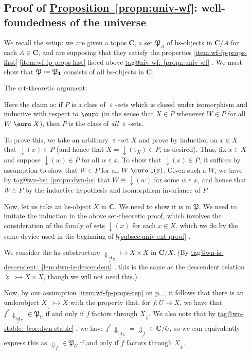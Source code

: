 \documentclass{amsart}
\makeatletter
\newcommand\alttext{\texorpdfstring}
\newcommand\bC{\mathbf{C}}
\newcommand\defeq{\mathrel{\vcenter{\baselineskip0.5ex \lineskiplimit0pt \hbox{.}\hbox{.}}} =}
\newcommand\dwnfn{{\downarrow}}
\newcommand\Dwn{{\Downarrow}}
\newcommand\Ein{\mathrel{\text{\textup{\euro}}}}
\newcommand\ein{\mathrel{\varepsilon}}
\newcommand\fP{\mathfrak{P}}
\newcommand\id{\mathrm{id}}
\newcommand\rt{\mathrm{t}}
\newcommand\tm{\mathbf{1}}
\newcommand\tto{\rightarrowtail}
\newcommand\und[1]{\underline{#1}}
\newcommand\unein{{\ein}}
\newcommand\unEin{{\Ein}}
\newcommand\tagword[1]{\csname tag@#1\endcsname}
\def\label@tag#1:#2\@nil{#1}
\newcommand\labeltag[1]{\label@tag#1:\@nil}
\newcommand\jref[1]{%
  \texorpdfstring%
    {\hyperref[#1]{\tagword{\labeltag{#1}}~\ref*{#1}}}%
    {\tagword{\labeltag{#1}}~\ref*{#1}}%
}
\newcommand\prerefpost[3]{%
  \texorpdfstring%
    {\hyperref[#2]{#1\ref*{#2}#3}}%
    {#1\ref*{#2}#3}%
}
\newcommand\sref[1]{\prerefpost{\S}{#1}{}}
\newcommand\pref[1]{\hyperref[#1]{p.~\pageref*{#1}}}
\theoremstyle{definition}
\theoremstyle{remark}
\theoremstyle{plainwithref}
\newenvironment{settybox}{\begin{tcolorbox}[colback=blue!20,breakable%
    ,enhanced%
    ,sharp corners%
    ,frame hidden%
    ,boxsep=0pt
    ,left=5pt,right=5pt,top=5pt,bottom=5pt
    ,enlarge left by=-5pt,width=\linewidth+10pt
    ,enlarge top by=5pt,enlarge bottom by=5pt
    ,before skip balanced=0pt,after skip balanced=0pt
    ]}{\end{tcolorbox}}
\makeatother
\begin{document}
\subsection{Proof of \alttext{\hyperref[propn:univ-wf]{Proposition~\ref*{propn:univ-wf}}}{Proposition~\ref*{propn:univ-wf}}: well-foundedness of the universe} \label{subsec:univ-wf-proof}
We recall the setup:
we are given a topos \( \bC \), a set \( \fP_A \) of hs-objects in \( \bC / A \) for each \( A \in \bC \), and are supposing that they satisfy the properties \ref{item:wf-fp-props-first}-\ref{item:wf-fp-props-last} listed above \jref{propn:univ-wf}.
We must show that \( \fP \defeq \fP_\tm \) consists of all hs-objects in \( \bC \).

The set-theoretic argument:
\begin{settybox}
  Here the claim is: if \( P \) is a class of \( \unein \)-sets which is closed under isomorphism and inductive with respect to \( \unEin \) (in the sense that \( X \in P \) whenever \( W \in P \) for all \( W \Ein X \)), then \( P \) is the class of \emph{all} \( \unein \)-sets.

  To prove this, we take an arbitrary \( \unein \)-set \( X \) and prove by induction on \( x \in X \) that \( \dwnfn(x) \in P \) (and hence that \( X = \dwnfn(\rt_X) \in P \), as desired).
  Thus, fix \( x \in X \) and suppose \( \dwnfn(w) \in P \) for all \( w \ein x \).
  To show that \( \dwnfn(x) \in P \), it suffices by assumption to show that \( W \in P \) for all \( W \Ein \dwnfn(x) \).
  Given such a \( W \), we have by \jref{propn:dwn-hs} that \( W \cong \dwnfn(w) \) for some \( w \ein x \), and hence that \( W \in P \) by the inductive hypothesis and isomorphism invariance of \( P \).
\end{settybox}

Now, let us take an hs-object \( X \) in \( \bC \).
We need to show it is in \( \fP \).
We need to imitate the induction in the above set-theoretic proof, which involves the consideration of the family of sets \( \dwnfn(x) \) for each \( x \in X \), which we do by the same device used in the beginning of \sref{subsec:univ-ext-proof}.

We consider the hs-substructure \( \und{\Dwn_{\id_X}} \tto \und{X \times X} \) in \( \bC / X \).
(By \jref{lem:dwn-is-descendent}, this is the same as the descendent relation \( {\succeq} \tto X \times X \), though we will not need this.).

Now, by our assumption \ref{item:wf-fp-props-rep} on \pref{item:wf-fp-props-rep}, it follows that there is an underobject \( X_{\Dwn} \tto X \) with the property that, for \( f \colon U \to X \), we have that \( f^* \und{\Dwn_{\id_X}} \in \fP_U \) if and only if \( f \) factors through \( X_{\Dwn} \).
We also note that by \jref{cor:dwn-stable}, we have \( f^* \und{\Dwn_{\id_X}} = \und{\Dwn_f} \in \bC / U \), so we can equivalently express this as \( \und{\Dwn_{f}} \in \fP_U \) if and only if \( f \) factors through \( X_{\Dwn} \).
\end{document}
